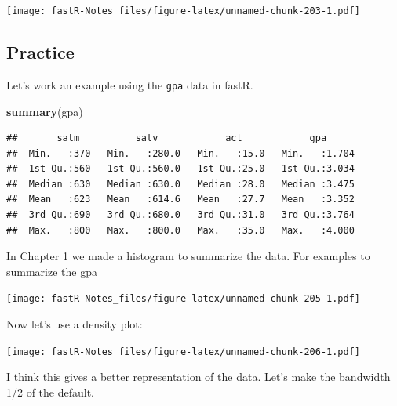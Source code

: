 \documentclass[]{book}
\newenvironment{Shaded}{\begin{snugshade}}{\end{snugshade}}
\newcommand{\KeywordTok}[1]{\textcolor[rgb]{0.13,0.29,0.53}{\textbf{#1}}}
\newcommand{\DataTypeTok}[1]{\textcolor[rgb]{0.13,0.29,0.53}{#1}}
\newcommand{\StringTok}[1]{\textcolor[rgb]{0.31,0.60,0.02}{#1}}
\newcommand{\OperatorTok}[1]{\textcolor[rgb]{0.81,0.36,0.00}{\textbf{#1}}}
\newcommand{\NormalTok}[1]{#1}
\theoremstyle{definition}
\theoremstyle{definition}
\theoremstyle{definition}
\theoremstyle{remark}
\begin{document}
\texttt{[image: fastR-Notes\_files/figure-latex/unnamed-chunk-203-1.pdf]}

\subsection{Practice}\label{practice-4}

Let's work an example using the \texttt{gpa} data in fastR.

\begin{Shaded}
\begin{Highlighting}[]
\KeywordTok{summary}\NormalTok{(gpa)}
\end{Highlighting}
\end{Shaded}

\begin{verbatim}
##       satm          satv            act            gpa       
##  Min.   :370   Min.   :280.0   Min.   :15.0   Min.   :1.704  
##  1st Qu.:560   1st Qu.:560.0   1st Qu.:25.0   1st Qu.:3.034  
##  Median :630   Median :630.0   Median :28.0   Median :3.475  
##  Mean   :623   Mean   :614.6   Mean   :27.7   Mean   :3.352  
##  3rd Qu.:690   3rd Qu.:680.0   3rd Qu.:31.0   3rd Qu.:3.764  
##  Max.   :800   Max.   :800.0   Max.   :35.0   Max.   :4.000
\end{verbatim}

In Chapter 1 we made a histogram to summarize the data. For examples to
summarize the gpa

\begin{Shaded}
\end{Shaded}

\texttt{[image: fastR-Notes\_files/figure-latex/unnamed-chunk-205-1.pdf]}

Now let's use a density plot:

\begin{Shaded}
\end{Shaded}

\texttt{[image: fastR-Notes\_files/figure-latex/unnamed-chunk-206-1.pdf]}

I think this gives a better representation of the data. Let's make the
bandwidth 1/2 of the default.
\end{document}
